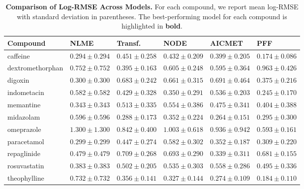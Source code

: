 \begin{table}[t]
    \centering
    \caption{\textbf{Comparison of Log-RMSE Across Models.}
    For each compound, we report mean log-RMSE with standard deviation in parentheses.
    The best-performing model for each compound is highlighted in \textbf{bold}.}
    \label{tab:main_results}
    \setlength{\tabcolsep}{3pt}
    \renewcommand{\arraystretch}{0.90}
    \smaller
    \begin{tabularx}{\textwidth}{l YYYYY}
        \toprule
        \textbf{Compound} & \textbf{NLME} & \textbf{Transf.} & \textbf{NODE} & \textbf{AICMET} & \textbf{PFF} \\
        \midrule
{}
caffeine & $0.294 \pm 0.294$ & $0.451 \pm 0.258$ & $0.432 \pm 0.209$ & $0.399 \pm 0.205$ & $\mathbf{0.174 \pm 0.086}$ \\
dextromethorphan & $0.752 \pm 0.752$ & $\mathbf{0.395 \pm 0.163}$ & $0.605 \pm 0.248$ & $0.595 \pm 0.364$ & $0.963 \pm 0.426$ \\
digoxin & $\mathbf{0.300 \pm 0.300}$ & $0.683 \pm 0.242$ & $0.661 \pm 0.315$ & $0.691 \pm 0.464$ & $0.375 \pm 0.216$ \\
indometacin & $0.582 \pm 0.582$ & $0.429 \pm 0.328$ & $0.350 \pm 0.291$ & $0.536 \pm 0.203$ & $\mathbf{0.245 \pm 0.170}$ \\
memantine & $\mathbf{0.343 \pm 0.343}$ & $0.513 \pm 0.335$ & $0.554 \pm 0.386$ & $0.475 \pm 0.341$ & $0.404 \pm 0.388$ \\
midazolam & $0.596 \pm 0.596$ & $0.288 \pm 0.173$ & $0.352 \pm 0.224$ & $\mathbf{0.264 \pm 0.151}$ & $0.295 \pm 0.300$ \\
omeprazole & $1.300 \pm 1.300$ & $0.842 \pm 0.400$ & $1.003 \pm 0.618$ & $0.936 \pm 0.942$ & $\mathbf{0.593 \pm 0.161}$ \\
paracetamol & $\mathbf{0.299 \pm 0.299}$ & $0.447 \pm 0.274$ & $0.582 \pm 0.302$ & $0.352 \pm 0.187$ & $0.309 \pm 0.220$ \\
repaglinide & $0.479 \pm 0.479$ & $0.709 \pm 0.268$ & $0.693 \pm 0.290$ & $\mathbf{0.339 \pm 0.311}$ & $0.681 \pm 0.155$ \\
rosuvastatin & $\mathbf{0.383 \pm 0.383}$ & $0.502 \pm 0.205$ & $0.535 \pm 0.303$ & $0.558 \pm 0.286$ & $0.495 \pm 0.336$ \\
theophylline & $0.732 \pm 0.732$ & $0.356 \pm 0.141$ & $0.327 \pm 0.144$ & $0.274 \pm 0.109$ & $\mathbf{0.184 \pm 0.110}$ \\

\end{tabularx}
\end{table}
